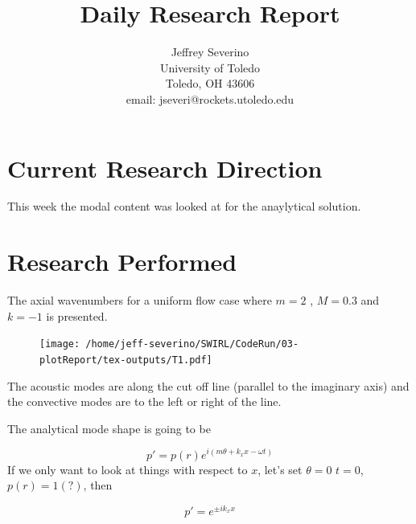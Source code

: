 \documentclass[a4paper]{article}
\begin{document}
\begin{titlepage}

    \title{
    Daily Research Report}

    \author{ Jeffrey Severino \\
        University of Toledo \\
        Toledo, OH  43606 \\
    email: jseveri@rockets.utoledo.edu}


    \maketitle

\end{titlepage}
\section{Current Research Direction}
This week the modal content was looked at for the anaylytical solution.
\section{Research Performed}
The axial wavenumbers for a uniform flow case where $m = 2$ , $M = 0.3$ and 
$k = -1$ is presented. 

 \begin{figure}[h!]
     \centering
     \texttt{[image: /home/jeff-severino/SWIRL/CodeRun/03-plotReport/tex-outputs/T1.pdf]}
 \end{figure}

 The acoustic modes are along the cut off line (parallel to the imaginary axis)
 and the convective modes are to the left or right of the line. 

 The analytical mode shape is going to be 

 \begin{equation}
     p' = p(r) e^{i(m \theta + k_x x - \omega t)}
 \end{equation}
 If we only want to look at things with respect to $x$, let's set $\theta = 0$
 $t = 0$, $p(r) = 1 (?)$, then


 \begin{equation}
     p' = e^{\pm i k_x x }
 \end{equation}
\end{document}
